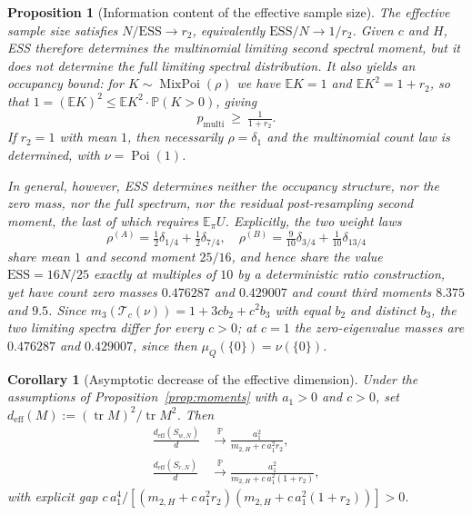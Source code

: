 \documentclass[lettersize,journal]{IEEEtran}
\newtheorem{prop}[theo]{Proposition}
\newtheorem{coro}[theo]{Corollary}
\theoremstyle{remark}
\begin{document}
\begin{prop}[Information content of the effective sample size]
\label{prop:ess}
The effective sample size satisfies $N/\mathrm{ESS}\to r_2$, equivalently
$\mathrm{ESS}/N\to1/r_2$. Given $c$ and $H$, ESS therefore determines the
multinomial limiting second spectral moment, but it does not determine the
full limiting spectral distribution. It also yields an occupancy bound: for
$K\sim\operatorname{MixPoi}(\rho)$ we have $\mathbb{E}K=1$ and
$\mathbb{E}K^2=1+r_2$, so that
$1=(\mathbb{E}K)^2\le\mathbb{E}K^2\cdot\mathbb{P}(K>0)$, giving
\begin{equation}
  p_{\mathrm{multi}}\ \ge\ \tfrac{1}{1+r_2}.
  \label{eq:occ-bound}
\end{equation}
If $r_2=1$ with mean $1$, then necessarily $\rho=\delta_1$ and the
multinomial count law is determined, with $\nu=\operatorname{Poi}(1)$.

In general, however, ESS determines neither the occupancy structure, nor the
zero mass, nor the full spectrum, nor the residual post-resampling second
moment, the last of which requires $\mathbb{E}_\pi U$. Explicitly, the two
weight laws
\begin{equation}
  \rho^{(A)}=\tfrac12\delta_{1/4}+\tfrac12\delta_{7/4},\quad
  \rho^{(B)}=\tfrac9{10}\delta_{3/4}+\tfrac1{10}\delta_{13/4}
  \label{eq:ess-pair}
\end{equation}
share mean $1$ and second moment $25/16$, and hence share the value
$\mathrm{ESS}=16N/25$ exactly at multiples of $10$ by a deterministic ratio
construction, yet have count zero masses $0.476287$ and $0.429007$ and count
third moments $8.375$ and $9.5$. Since
$m_3(\mathcal{T}_c(\nu))=1+3cb_2+c^2b_3$ with equal $b_2$ and distinct $b_3$,
the two limiting spectra differ for every $c>0$; at $c=1$ the
zero-eigenvalue masses are $0.476287$ and $0.429007$, since then
$\mu_Q(\{0\})=\nu(\{0\})$.
\end{prop}

\begin{coro}[Asymptotic decrease of the effective dimension]
\label{coro:deff}
Under the assumptions of Proposition~\ref{prop:moments} with $a_1>0$ and
$c>0$, set $d_{\mathrm{eff}}(M):=(\operatorname{tr}M)^2/\operatorname{tr}M^2$.
Then
\begin{align}
  \tfrac{d_{\mathrm{eff}}(S_{w,N})}{d}
    &\xrightarrow{\mathbb{P}} \tfrac{a_1^2}{m_{2,H}+c\,a_1^2r_2},\nonumber\\
  \tfrac{d_{\mathrm{eff}}(S_{r,N})}{d}
    &\xrightarrow{\mathbb{P}}
      \tfrac{a_1^2}{m_{2,H}+c\,a_1^2(1+r_2)},
  \label{eq:deff}
\end{align}
with explicit gap
$c\,a_1^4/[(m_{2,H}+c\,a_1^2r_2)(m_{2,H}+c\,a_1^2(1+r_2))]>0$.
\end{coro}
\end{document}
